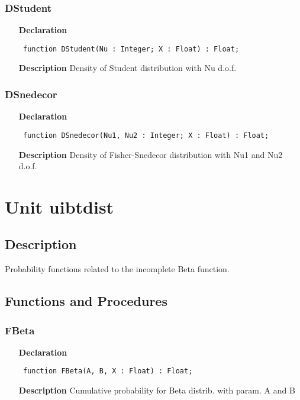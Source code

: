 \documentclass[12pt,a4paper,oneside]{report}
\newcommand{\declarationitem}[1]{\textbf{#1}}
\newcommand{\descriptiontitle}[1]{\textbf{#1}}
\newcommand{\code}[1]{\texttt{#1}}
\begin{document}
\subsubsection{DStudent}
\label{ugamdist-DStudent}
\begin{itemize}\item[\declarationitem{Declaration}\hfill]
	\begin{flushleft}
		\code{
			function DStudent(Nu : Integer; X : Float) : Float;}
	\end{flushleft}
	\item[\descriptiontitle{Description}]
	Density of Student distribution with Nu d.o.f.
\end{itemize}
\subsubsection{DSnedecor}
\label{ugamdist-DSnedecor}
\begin{itemize}\item[\declarationitem{Declaration}\hfill]
	\begin{flushleft}
		\code{
			function DSnedecor(Nu1, Nu2 : Integer; X : Float) : Float;}
	\end{flushleft}
	\item[\descriptiontitle{Description}]
	Density of Fisher{-}Snedecor distribution with Nu1 and Nu2 d.o.f.
\end{itemize}
\section{Unit uibtdist}
\label{uibtdist}
\subsection{Description}
Probability functions related to the incomplete Beta function.
\subsection{Functions and Procedures}
\subsubsection{FBeta}
\label{uibtdist-FBeta}
\begin{itemize}\item[\declarationitem{Declaration}\hfill]
	\begin{flushleft}
		\code{
			function FBeta(A, B, X : Float) : Float;}
	\end{flushleft}
	\item[\descriptiontitle{Description}]
	Cumulative probability for Beta distrib. with param. A and B
\end{itemize}
\end{document}
